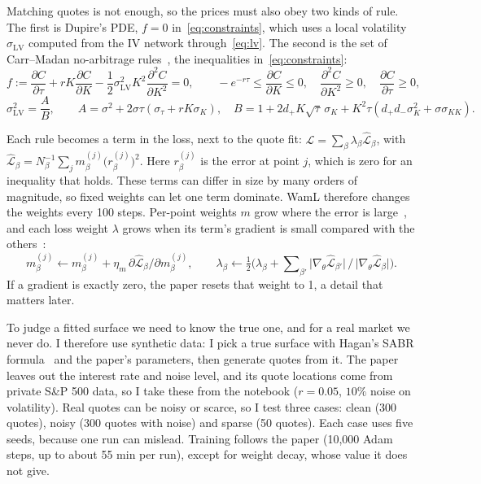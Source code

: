 \documentclass[10pt]{article}
\begin{document}
Matching quotes is not enough, so the prices must also obey two kinds of rule. The first is Dupire's PDE, $f=0$ in~\eqref{eq:constraints}, which uses a local volatility $\sigma_{\mathrm{LV}}$ computed from the IV network through~\eqref{eq:lv}. The second is the set of Carr--Madan no-arbitrage rules~\cite{carr}, the inequalities in~\eqref{eq:constraints}:
\begin{equation}
  f := \frac{\partial C}{\partial \tau}+rK\frac{\partial C}{\partial K}-\frac12\sigma_{\mathrm{LV}}^2K^2\frac{\partial^2 C}{\partial K^2}=0,
  \qquad
  -e^{-r\tau}\le\frac{\partial C}{\partial K}\le 0,\quad
  \frac{\partial^2 C}{\partial K^2}\ge 0,\quad
  \frac{\partial C}{\partial \tau}\ge 0,
  \label{eq:constraints}
\end{equation}
\begin{equation}
  \sigma_{\mathrm{LV}}^2=\frac{A}{B},\qquad A=\sigma^2+2\sigma\tau\left(\sigma_\tau+rK\sigma_K\right),\quad
  B=1+2d_+K\sqrt{\tau}\,\sigma_K+K^2\tau\left(d_+d_-\sigma_K^2+\sigma\sigma_{KK}\right).
  \label{eq:lv}
\end{equation}

Each rule becomes a term in the loss, next to the quote fit: $\mathcal{L}=\sum_\beta\lambda_\beta\hat{\mathcal L}_\beta$, with $\hat{\mathcal L}_\beta=N_\beta^{-1}\sum_j m_\beta^{(j)}\big(r_\beta^{(j)}\big)^2$. Here $r_\beta^{(j)}$ is the error at point $j$, which is zero for an inequality that holds. These terms can differ in size by many orders of magnitude, so fixed weights can let one term dominate. WamL therefore changes the weights every 100 steps. Per-point weights $m$ grow where the error is large~\cite{sapinn}, and each loss weight $\lambda$ grows when its term's gradient is small compared with the others~\cite{expert}:
\begin{equation}
  m_\beta^{(j)}\leftarrow m_\beta^{(j)}+\eta_m\,\partial\hat{\mathcal L}_\beta/\partial m_\beta^{(j)},
  \qquad
  \lambda_\beta\leftarrow\tfrac12\Big(\lambda_\beta+\sum\nolimits_{\beta'}\big|\nabla_\theta\hat{\mathcal L}_{\beta'}\big|\,\big/\,\big|\nabla_\theta\hat{\mathcal L}_{\beta}\big|\Big).
  \label{eq:waml}
\end{equation}
If a gradient is exactly zero, the paper resets that weight to 1, a detail that matters later.

To judge a fitted surface we need to know the true one, and for a real market we never do. I therefore use synthetic data: I pick a true surface with Hagan's SABR formula~\cite{sabr} and the paper's parameters, then generate quotes from it. The paper leaves out the interest rate and noise level, and its quote locations come from private S\&P 500 data, so I take these from the notebook ($r=0.05$, $10\%$ noise on volatility). Real quotes can be noisy or scarce, so I test three cases: clean (300 quotes), noisy (300 quotes with noise) and sparse (50 quotes). Each case uses five seeds, because one run can mislead. Training follows the paper (10,000 Adam steps, up to about 55 min per run), except for weight decay, whose value it does not give.
\end{document}
